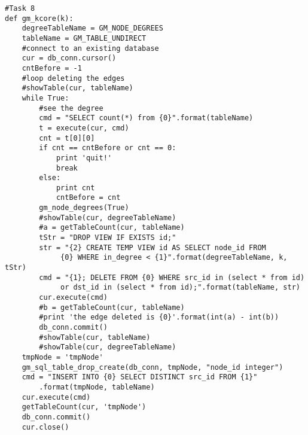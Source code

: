\begin{verbatim}
#Task 8
def gm_kcore(k):
    degreeTableName = GM_NODE_DEGREES
    tableName = GM_TABLE_UNDIRECT
    #connect to an existing database
    cur = db_conn.cursor()
    cntBefore = -1
    #loop deleting the edges
    #showTable(cur, tableName)
    while True:
        #see the degree
        cmd = "SELECT count(*) from {0}".format(tableName)
        t = execute(cur, cmd)
        cnt = t[0][0]
        if cnt == cntBefore or cnt == 0:
            print 'quit!'
            break
        else:
            print cnt
            cntBefore = cnt
        gm_node_degrees(True)
        #showTable(cur, degreeTableName)    
        #a = getTableCount(cur, tableName)
        tStr = "DROP VIEW IF EXISTS id;"
        str = "{2} CREATE TEMP VIEW id AS SELECT node_id FROM
             {0} WHERE in_degree < {1}".format(degreeTableName, k, tStr)
        cmd = "{1}; DELETE FROM {0} WHERE src_id in (select * from id)
             or dst_id in (select * from id);".format(tableName, str)
        cur.execute(cmd)
        #b = getTableCount(cur, tableName)
        #print 'the edge deleted is {0}'.format(int(a) - int(b))
        db_conn.commit()
        #showTable(cur, tableName)
        #showTable(cur, degreeTableName)
    tmpNode = 'tmpNode'
    gm_sql_table_drop_create(db_conn, tmpNode, "node_id integer")
    cmd = "INSERT INTO {0} SELECT DISTINCT src_id FROM {1}"
        .format(tmpNode, tableName)    
    cur.execute(cmd)
    getTableCount(cur, 'tmpNode')
    db_conn.commit()
    cur.close()
\end{verbatim}